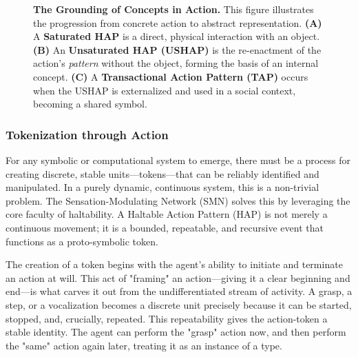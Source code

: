 \begin{figure}[ht]
    \centering
    \caption{\textbf{The Grounding of Concepts in Action.} This figure illustrates the progression from concrete action to abstract representation. \textbf{(A)} A \textbf{Saturated HAP} is a direct, physical interaction with an object. \textbf{(B)} An \textbf{Unsaturated HAP (USHAP)} is the re-enactment of the action's \textit{pattern} without the object, forming the basis of an internal concept. \textbf{(C)} A \textbf{Transactional Action Pattern (TAP)} occurs when the USHAP is externalized and used in a social context, becoming a shared symbol.}
    \label{fig:saturation_spectrum}
\end{figure}

\subsubsection{Tokenization through Action}
\label{ssubsec:tokenization}
For any symbolic or computational system to emerge, there must be a process for creating discrete, stable units—tokens—that can be reliably identified and manipulated. In a purely dynamic, continuous system, this is a non-trivial problem. The Sensation-Modulating Network (SMN) solves this by leveraging the core faculty of haltability. A Haltable Action Pattern (HAP) is not merely a continuous movement; it is a bounded, repeatable, and recursive event that functions as a proto-symbolic token.

The creation of a token begins with the agent's ability to initiate and terminate an action at will. This act of "framing" an action—giving it a clear beginning and end—is what carves it out from the undifferentiated stream of activity. A grasp, a step, or a vocalization becomes a discrete unit precisely because it can be started, stopped, and, crucially, repeated. This repeatability gives the action-token a stable identity. The agent can perform the "grasp" action now, and then perform the "same" action again later, treating it as an instance of a type.

